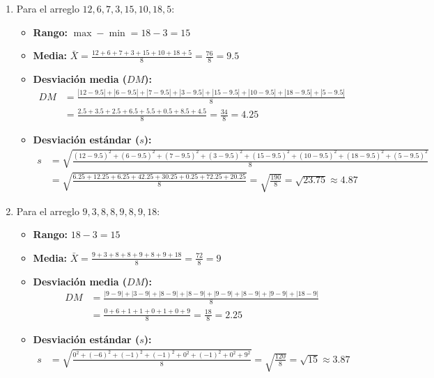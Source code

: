 \begin{solproblema}[prob:ba2e465]
	\begin{enumerate}
		\item Para el arreglo $12,6,7,3,15,10,18,5$:
		\begin{itemize}
			\item \textbf{Rango:} $\max - \min = 18 - 3 = 15$
			\item \textbf{Media:} $\bar{X} = \frac{12+6+7+3+15+10+18+5}{8} = \frac{76}{8} = 9.5$
			\item \textbf{Desviación media ($DM$):}
			\begin{align}
				DM &= \frac{|12-9.5| + |6-9.5| + |7-9.5| + |3-9.5| + |15-9.5| + |10-9.5| + |18-9.5| + |5-9.5|}{8} \\
				&= \frac{2.5 + 3.5 + 2.5 + 6.5 + 5.5 + 0.5 + 8.5 + 4.5}{8} = \frac{34}{8} = 4.25
			\end{align}
			\item \textbf{Desviación estándar ($s$):}
			\begin{align}
				s &= \sqrt{\frac{(12-9.5)^2 + (6-9.5)^2 + (7-9.5)^2 + (3-9.5)^2 + (15-9.5)^2 + (10-9.5)^2 + (18-9.5)^2 + (5-9.5)^2}{8}} \\
				&= \sqrt{\frac{6.25 + 12.25 + 6.25 + 42.25 + 30.25 + 0.25 + 72.25 + 20.25}{8}} = \sqrt{\frac{190}{8}} = \sqrt{23.75} \approx 4.87
			\end{align}
		\end{itemize}

		\item Para el arreglo $9,3,8,8,9,8,9,18$:
		\begin{itemize}
			\item \textbf{Rango:} $18 - 3 = 15$
			\item \textbf{Media:} $\bar{X} = \frac{9+3+8+8+9+8+9+18}{8} = \frac{72}{8} = 9$
			\item \textbf{Desviación media ($DM$):}
			\begin{align}
				DM &= \frac{|9-9| + |3-9| + |8-9| + |8-9| + |9-9| + |8-9| + |9-9| + |18-9|}{8} \\
				&= \frac{0 + 6 + 1 + 1 + 0 + 1 + 0 + 9}{8} = \frac{18}{8} = 2.25
			\end{align}
			\item \textbf{Desviación estándar ($s$):}
			\begin{align}
				s &= \sqrt{\frac{0^2 + (-6)^2 + (-1)^2 + (-1)^2 + 0^2 + (-1)^2 + 0^2 + 9^2}{8}} = \sqrt{\frac{120}{8}} = \sqrt{15} \approx 3.87
			\end{align}
		\end{itemize}
	\end{enumerate}
\end{solproblema}

